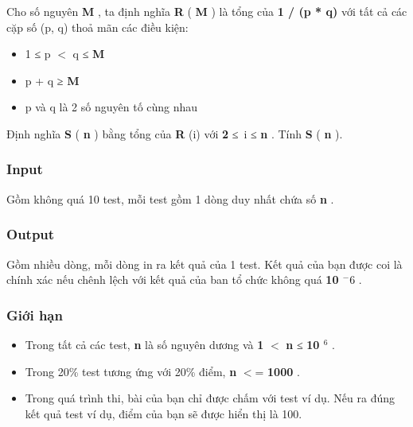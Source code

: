 





   Cho số nguyên   \textbf{    M   }   , ta định nghĩa   \textbf{    R   }   (   \textbf{    M   }   ) là tổng của   \textbf{    1 / (p * q)   }   với tất cả các cặp số (p, q) thoả mãn các điều kiện:  
\begin{itemize}
	\item     1 ≤ p $<$ q ≤    \textbf{     M    }
	\item     p + q ≥    \textbf{     M    }
	\item     p và q là 2 số nguyên tố cùng nhau   
\end{itemize}

   Định nghĩa   \textbf{    S   }   (   \textbf{    n   }   ) bằng tổng của   \textbf{    R   }   (i) với   \textbf{    2   }   ≤ i ≤   \textbf{    n   }   . Tính   \textbf{    S   }   (   \textbf{    n   }   ).  

\subsubsection{   Input  }

   Gồm không quá 10 test, mỗi test gồm 1 dòng duy nhất chứa số   \textbf{    n   }   .  

\subsubsection{   Output  }

   Gồm nhiều dòng, mỗi dòng in ra kết quả của 1 test. Kết quả của bạn được coi là chính xác nếu chênh lệch với kết quả của ban tổ chức không quá   \textbf{    10    $^     -6    $}   .  

\subsubsection{   Giới hạn  }
\begin{itemize}
	\item     Trong tất cả các test,    \textbf{     n    }    là số nguyên dương và    \textbf{     1    }    $<$    \textbf{     n    }    ≤    \textbf{     10     $^      6     $}    .   
	\item     Trong 20\% test tương ứng với 20\% điểm,    \textbf{     n    }    $<$=    \textbf{     1000    }    .   
	\item     Trong quá trình thi, bài của bạn chỉ được chấm với test ví dụ. Nếu ra đúng kết quả test ví dụ, điểm của bạn sẽ được hiển thị là 100.   
\end{itemize}

